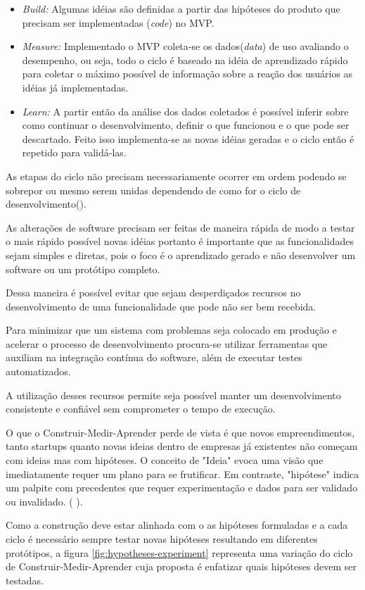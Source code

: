 \begin{itemize}
\item \emph{Build:} Algumas idéias são definidas a partir das hipóteses do produto que precisam ser implementadas (\emph{code}) no MVP.
\item \emph{Measure:} Implementado o MVP coleta-se os dados(\emph{data}) de uso avaliando o desempenho, ou seja, todo o ciclo é baseado na idéia de aprendizado rápido para coletar o máximo possível de informação sobre a reação dos usuários as idéias já implementadas.
\item \emph{Learn:} A partir então da análise dos dados coletados é possível inferir sobre como continuar o desenvolvimento, definir o que funcionou e o que pode ser descartado. Feito isso implementa-se as novas idéias geradas e o ciclo então é repetido para validá-las.
\end{itemize}
\par As etapas do ciclo não precisam necessariamente ocorrer em ordem podendo se sobrepor ou mesmo serem unidas dependendo de como for o ciclo de desenvolvimento(\cite{ries:11}). 
\par As alterações de software precisam ser feitas de maneira rápida de modo a testar o mais rápido possível novas idéias portanto é importante que as funcionalidades sejam simples e diretas, pois o foco é o aprendizado gerado e não desenvolver um software ou um protótipo completo. 
\par Dessa maneira é possível evitar que sejam desperdiçados recursos no desenvolvimento de uma funcionalidade que pode não ser bem recebida.
\par Para minimizar que um sistema com problemas seja colocado em produção e acelerar o processo de desenvolvimento procura-se utilizar ferramentas que auxiliam na integração contínua do software, além de executar testes automatizados. 
\par A utilização desses recursos permite seja possível manter um desenvolvimento consistente e confiável sem comprometer o tempo de execução.
\par O que o Construir-Medir-Aprender perde de vista é que novos empreendimentos, tanto startups quanto novas ideias dentro de empresas já existentes não começam com ideias mas com hipóteses. O conceito de "Ideia" evoca uma visão que imediatamente requer um plano para se frutificar. Em contraste, "hipótese" indica um palpite com precedentes que requer experimentação e dados para ser validado ou invalidado. (\cite{blankendeavor} ).
\par Como a construção deve estar alinhada com o as hipóteses formuladas e a cada ciclo é necessário sempre testar novas hipóteses resultando em diferentes protótipos, a figura \ref{fig:hypotheses-experiment} representa uma variação do ciclo de Construir-Medir-Aprender cuja proposta é enfatizar quais hipóteses devem ser testadas.
